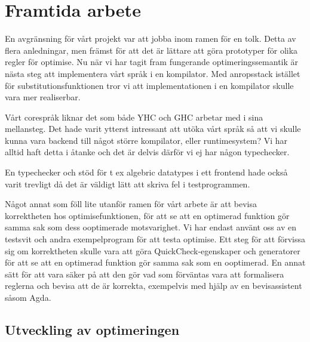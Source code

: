 \documentclass[Rapport]{subfiles}
\begin{document}
\section{Framtida arbete}

En avgränsning för vårt projekt var att jobba inom ramen för en tolk.
Detta av flera anledningar, men främst för att det är lättare att göra prototyper för 
olika regler för optimise. Nu när vi har tagit fram fungerande optimeringssemantik 
är nästa steg att implementera vårt språk i en kompilator.
Med anropsstack istället för substitutionsfunktionen tror vi att implementationen
i en kompilator skulle vara mer realiserbar.


Vårt corespråk liknar det som både YHC och GHC arbetar med i sina mellansteg.
Det hade varit ytterst intressant att utöka vårt språk så att vi skulle kunna 
vara backend till något större kompilator, eller runtimesystem?
Vi har alltid haft detta i åtanke och det är delvis därför vi ej har någon 
typechecker.




En typechecker och stöd för t ex algebric datatypes i ett frontend hade också
varit trevligt då det är väldigt lätt att skriva fel i testprogrammen. 


Något annat som föll lite utanför ramen för vårt arbete är att bevisa
korrektheten hos optimisefunktionen, för att se att en optimerad funktion
gör samma sak som dess ooptimerade motsvarighet. Vi har endast använt oss av en testsvit
och andra exempelprogram för att testa optimise. Ett steg för att förvissa sig
om korrektheten skulle vara att göra QuickCheck-egenskaper och generatorer för att se
att en optimerad funktion gör samma sak som en ooptimerad. En annat sätt för att vara säker på att den
gör vad som förväntas vara att formalisera reglerna och bevisa
att de är korrekta, exempelvis med hjälp av en bevisassistent såsom Agda.


\subsection{Utveckling av optimeringen}
\end{document}
